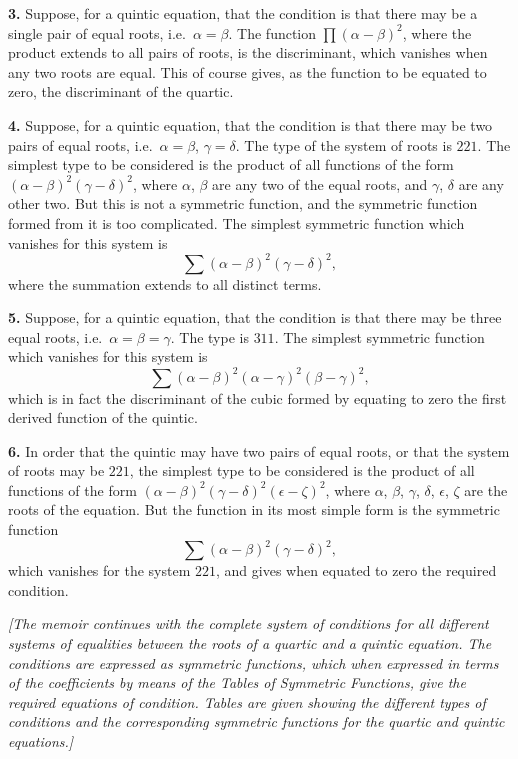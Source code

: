 \documentclass[11pt,a4paper]{book}
\begin{document}
\begin{center}
\textbf{3.} Suppose, for a quintic equation, that the condition is that there
may be a single pair of equal roots, i.e.\ $\alpha = \beta$. The function
$\prod(\alpha - \beta)^2$, where the product extends to all pairs of roots,
is the discriminant, which vanishes when any two roots are equal. This of
course gives, as the function to be equated to zero, the discriminant of the
quartic.

\textbf{4.} Suppose, for a quintic equation, that the condition is that there
may be two pairs of equal roots, i.e.\ $\alpha = \beta$, $\gamma = \delta$.
The type of the system of roots is $221$. The simplest type to be considered
is the product of all functions of the form
$(\alpha - \beta)^2 (\gamma - \delta)^2$, where $\alpha$, $\beta$ are any
two of the equal roots, and $\gamma$, $\delta$ are any other two. But this
is not a symmetric function, and the symmetric function formed from it is too
complicated. The simplest symmetric function which vanishes for this system is
\[
\sum (\alpha - \beta)^2 (\gamma - \delta)^2,
\]
where the summation extends to all distinct terms.

\textbf{5.} Suppose, for a quintic equation, that the condition is that there
may be three equal roots, i.e.\ $\alpha = \beta = \gamma$. The type is
$311$. The simplest symmetric function which vanishes for this system is
\[
\sum (\alpha - \beta)^2 (\alpha - \gamma)^2 (\beta - \gamma)^2,
\]
which is in fact the discriminant of the cubic formed by equating to zero the
first derived function of the quintic.

\textbf{6.} In order that the quintic may have two pairs of equal roots, or
that the system of roots may be $221$, the simplest type to be considered is
the product of all functions of the form
$(\alpha - \beta)^2 (\gamma - \delta)^2 (\epsilon - \zeta)^2$, where
$\alpha$, $\beta$, $\gamma$, $\delta$, $\epsilon$, $\zeta$ are the roots of
the equation. But the function in its most simple form is the symmetric
function
\[
\sum (\alpha - \beta)^2 (\gamma - \delta)^2,
\]
which vanishes for the system $221$, and gives when equated to zero the
required condition.

\textit{[The memoir continues with the complete system of conditions for all
different systems of equalities between the roots of a quartic and a quintic
equation. The conditions are expressed as symmetric functions, which when
expressed in terms of the coefficients by means of the Tables of Symmetric
Functions, give the required equations of condition. Tables are given showing
the different types of conditions and the corresponding symmetric functions
for the quartic and quintic equations.]}


\end{center}
\end{document}
